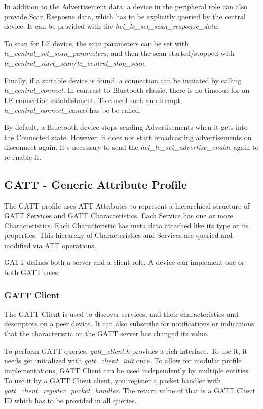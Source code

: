 In addition to the Advertisement data, a device in the peripheral role can also provide Scan Rseposne data, which has to be explicitly queried by the central device. It can be provided with the \emph{hci\_le\_set\_scan\_response\_data}.

To scan for LE device, the scan parameters can be set with \emph{le\_central\_set\_scan\_parameters}, and then the scan started/stopped with \emph{le\_central\_start\_scan}/\emph{le\_central\_stop\_scan}.

Finally, if a suitable device is found, a connection can be initiated by calling \emph{le\_central\_connect}. In contrast to Bluetooth classic, there is no timeout for an LE connection establishment. To cancel such an attempt, \emph{le\_central\_connect\_cancel} has be be called.

By default, a Bluetooth device stops sending Advertisements when it gets into the Connected state. However, it does not start broadcasting advertisements on disconnect again. It's necessary to send the \emph{hci\_le\_set\_advertise\_enable} again to re-enable it.

\subsection{GATT - Generic Attribute Profile}
The GATT profile uses ATT Attributes to represent a hierarchical structure of GATT Services and GATT Characteristics. Each Service has one or more Characteristics. Each Characteristic has meta data attached like its type or its properties. This hierarchy of Characteristics and Services are queried and modified via ATT operations.

GATT defines both a server and a client role. A device can implement one or both GATT roles.

\subsubsection{GATT Client}
The GATT Client is used to discover services, and their characteristics and descriptors on a peer device. It can also subscribe for notifications or indications that the characteristic on the GATT server has changed its value. 

To perform GATT queries, \emph{gatt\_client.h} provides a rich interface. To use it, it needs get initialized with \emph{gatt\_client\_init} once. To allow for modular profile implementations, GATT Client can be used independently by multiple entities. To use it by a GATT Client client, you register a packet handler with \emph{gatt\_client\_register\_packet\_handler}. The return value of that is a GATT Client ID which has to be provided in all queries.


